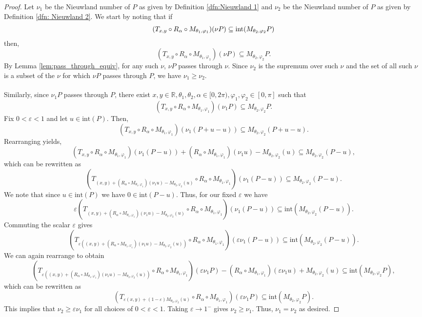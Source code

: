 \documentclass[a4paper]{amsart}
\renewcommand{\phi}{\varphi}
\renewcommand{\epsilon}{\varepsilon}
\theoremstyle{remark}
\begin{document}
\begin{proof}
Let $\nu_1$ be the Nieuwland number of $P$ as given by Definition \ref{dfn:Nieuwland 1} and $\nu_2$ be the Nieuwland number of $P$ as given by Definition \ref{dfn: Nieuwland 2}. We start by noting that if
$$(T_{x,y}\circ R_\alpha\circ M_{\theta_1,\phi_1})(\nu P)\subseteq \textup{int}(M_{\theta_2,\phi_2}P)$$
then,
$$(T_{x,y}\circ R_\alpha\circ M_{\theta_1,\phi_1})(\nu P)\subseteq M_{\theta_2,\phi_2}P.$$ By Lemma \ref{lem:pass_through_equiv}, for any such $\nu$, $\nu P$ passes through $\nu$. Since $\nu_2$ is the supremum over such $\nu$ and the set of all such $\nu$ is a subset of the $\nu$ for which $\nu P$ passes through $P$, we have $\nu_1 \geq \nu_2$.
\\\\
Similarly, since $\nu_1 P$ passes through $P$, there exist $x,y\in\mathbb{R},\theta_1,\theta_2,\alpha\in[0,2\pi),\phi_1,\phi_2\in[0,\pi]$ such that $$(T_{x,y}\circ R_\alpha\circ M_{\theta_1,\phi_1})(\nu_1 P)\subseteq M_{\theta_2,\phi_2}P.$$ Fix $0< \epsilon < 1$ and let $u\in \textrm{int}(P)$. Then,
$$(T_{x,y}\circ R_\alpha\circ M_{\theta_1,\phi_1})(\nu_1 (P+u-u))\subseteq M_{\theta_2,\phi_2}(P+u-u).$$ Rearranging yields, $$(T_{x,y}\circ R_\alpha\circ M_{\theta_1,\phi_1})(\nu_1 (P-u))+(R_\alpha\circ M_{\theta_1,\phi_1})(\nu_1 u)-M_{\theta_2,\phi_2}(u)\subseteq M_{\theta_2,\phi_2}(P-u),$$ which can be rewritten as $$(T_{(x,y)+(R_\alpha\circ M_{\theta_1,\phi_1})(\nu_1 u)-M_{\theta_2,\phi_2}(u)}\circ R_\alpha\circ M_{\theta_1,\phi_1})(\nu_1 (P-u))\subseteq M_{\theta_2,\phi_2}(P-u).$$ We note that since $u\in \textrm{int}(P)$ we have $0\in \textrm{int}(P-u)$. Thus, for our fixed $\epsilon$ we have
$$\varepsilon(T_{(x,y)+(R_\alpha\circ M_{\theta_1,\phi_1})(\nu_1 u)-M_{\theta_2,\phi_2}(u)}\circ R_\alpha\circ M_{\theta_1,\phi_1})(\nu_1 (P-u))\subseteq \textrm{int}(M_{\theta_2,\phi_2}(P-u)).$$ Commuting the scalar $\epsilon$ gives
$$(T_{\epsilon((x,y)+(R_\alpha\circ M_{\theta_1,\phi_1})(\nu_1 u)-M_{\theta_2,\phi_2}(u))}\circ R_\alpha\circ M_{\theta_1,\phi_1})(\epsilon\nu_1 (P-u))\subseteq \textrm{int}(M_{\theta_2,\phi_2}(P-u)).$$ We can again rearrange to obtain $$(T_{\epsilon((x,y)+(R_\alpha\circ M_{\theta_1,\phi_1})(\nu_1 u)-M_{\theta_2,\phi_2}(u))}\circ R_\alpha\circ M_{\theta_1,\phi_1})(\epsilon\nu_1 P)-(R_\alpha\circ M_{\theta_1,\phi_1})(\epsilon\nu_1 u)+M_{\theta_2,\phi_2}(u)\subseteq \textrm{int}(M_{\theta_2,\phi_2}P),$$ which can be rewritten as $$(T_{\epsilon(x,y)+(1-\varepsilon)M_{\theta_2,\phi_2}(u)}\circ R_\alpha\circ M_{\theta_1,\phi_1})(\epsilon\nu_1 P)\subseteq \textrm{int}(M_{\theta_2,\phi_2}P).$$ This implies that $\nu_2\geq \varepsilon \nu_1$ for all choices of $0<\epsilon<1$. Taking $\varepsilon\to1^-$ gives $\nu_2\geq\nu_1$. Thus, $\nu_1=\nu_2$ as desired.
\end{proof}



 
                            
\end{document}
